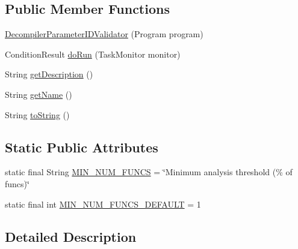 \subsection*{Public Member Functions}
\begin{DoxyCompactItemize}
\item 
\mbox{\hyperlink{classghidra_1_1app_1_1plugin_1_1core_1_1decompiler_1_1validator_1_1_decompiler_parameter_i_d_validator_a0466315dd5c08d1fa8b809899779fe68}{Decompiler\+Parameter\+I\+D\+Validator}} (Program program)
\item 
Condition\+Result \mbox{\hyperlink{classghidra_1_1app_1_1plugin_1_1core_1_1decompiler_1_1validator_1_1_decompiler_parameter_i_d_validator_a2b0fb433298c1340f7722fa270c471c4}{do\+Run}} (Task\+Monitor monitor)
\item 
String \mbox{\hyperlink{classghidra_1_1app_1_1plugin_1_1core_1_1decompiler_1_1validator_1_1_decompiler_parameter_i_d_validator_ad67f7c62d7b66d134dcdf2400c8f124c}{get\+Description}} ()
\item 
String \mbox{\hyperlink{classghidra_1_1app_1_1plugin_1_1core_1_1decompiler_1_1validator_1_1_decompiler_parameter_i_d_validator_a0ef67f4e424402ced87f3e21b5b4c400}{get\+Name}} ()
\item 
String \mbox{\hyperlink{classghidra_1_1app_1_1plugin_1_1core_1_1decompiler_1_1validator_1_1_decompiler_parameter_i_d_validator_a4a174bda01fce2851a653bef145fe4a3}{to\+String}} ()
\end{DoxyCompactItemize}
\subsection*{Static Public Attributes}
\begin{DoxyCompactItemize}
\item 
static final String \mbox{\hyperlink{classghidra_1_1app_1_1plugin_1_1core_1_1decompiler_1_1validator_1_1_decompiler_parameter_i_d_validator_a6ff33c1e9122aff058b1587aedc942ea}{M\+I\+N\+\_\+\+N\+U\+M\+\_\+\+F\+U\+N\+CS}} = \char`\"{}Minimum analysis threshold (\% of funcs)\char`\"{}
\item 
static final int \mbox{\hyperlink{classghidra_1_1app_1_1plugin_1_1core_1_1decompiler_1_1validator_1_1_decompiler_parameter_i_d_validator_a7446b3808bd70f5ad034e9e3e6240e69}{M\+I\+N\+\_\+\+N\+U\+M\+\_\+\+F\+U\+N\+C\+S\+\_\+\+D\+E\+F\+A\+U\+LT}} = 1
\end{DoxyCompactItemize}


\subsection{Detailed Description}


